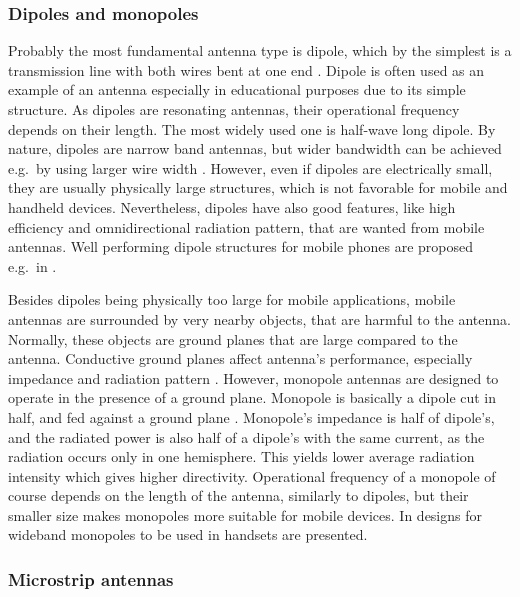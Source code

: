 \subsubsection{Dipoles and monopoles}
\label{sec:dipole}

Probably the most fundamental antenna type is dipole, which by the simplest is a transmission line with both wires bent at one end \cite{stutzman}. Dipole is often used as an example of an antenna especially in educational purposes due to its simple structure. As dipoles are resonating antennas, their operational frequency depends on their length. The most widely used one is half-wave long dipole.  By nature, dipoles are narrow band antennas, but wider bandwidth can be achieved e.g.\ by using larger wire width \cite{stutzman,balanis}. However, even if dipoles are electrically small, they are usually physically large structures, which is not favorable for mobile and handheld devices. Nevertheless, dipoles have also good features, like high efficiency and omnidirectional radiation pattern, that are wanted from mobile antennas. Well performing dipole structures for mobile phones are proposed e.g.\ in \cite{dipole_example1,dipole_example2}.

Besides dipoles being physically too large for mobile applications, mobile antennas are surrounded by very nearby objects, that are harmful to the antenna. Normally, these objects are ground planes that are large compared to the antenna. Conductive ground planes affect antenna's performance, especially impedance and radiation pattern \cite{stutzman}. However, monopole antennas are designed to operate in the presence of a ground plane. Monopole is basically a dipole cut in half, and fed against a ground plane \cite{stutzman}. Monopole's impedance is half of dipole's, and the radiated power is also half of a dipole's with the same current, as the radiation occurs only in one hemisphere. This yields lower average radiation intensity which gives higher directivity. Operational frequency of a monopole of course depends on the length of the antenna, similarly to dipoles, but their smaller size makes monopoles more suitable for mobile devices. In \cite{monopole_example1,monopole_example2} designs for wideband monopoles to be used in handsets are presented.

\subsubsection{Microstrip antennas}
\label{sec:microstrip}

